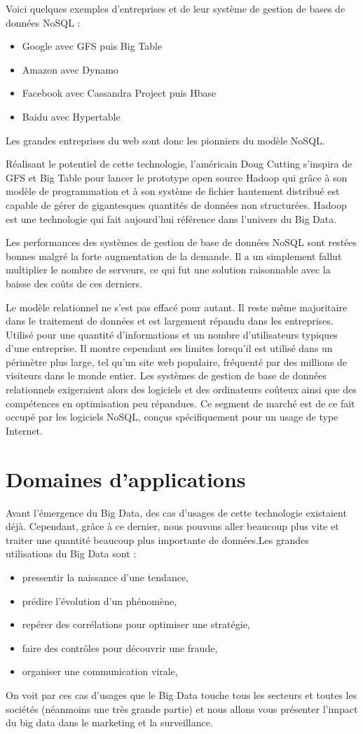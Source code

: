 \documentclass[12pt]{article}
\begin{document}
Voici quelques exemples d’entreprises et de leur système de gestion de bases de données NoSQL :
\begin{itemize}
\item Google avec GFS puis Big Table 
\item Amazon avec Dynamo
\item Facebook avec Cassandra Project puis Hbase
\item Baidu avec Hypertable
\end{itemize}
\par
Les grandes entreprises du web sont donc les pionniers du modèle NoSQL.
\par
Réalisant le potentiel de cette technologie, l’américain Doug Cutting s’inspira de GFS et Big Table pour lancer le prototype open source Hadoop qui grâce à son modèle de programmation et à son système de fichier hautement distribué est capable de gérer de gigantesques quantités de données non structurées. Hadoop est une technologie qui fait aujourd’hui référence dans l’univers du Big Data.
\par
Les performances des systèmes de gestion de base de données NoSQL sont restées bonnes malgré la forte augmentation de la demande. Il a un simplement fallut multiplier le nombre de serveurs, ce qui fut une solution raisonnable  avec la baisse des coûts de ces derniers.
\par
Le modèle relationnel ne s’est pas effacé pour autant. Il reste même majoritaire dans le traitement de données et est largement répandu dans les entreprises. Utilisé pour une quantité d'informations et un nombre d'utilisateurs typiques d'une entreprise. Il montre cependant ses limites lorsqu'il est utilisé dans un périmètre plus large, tel qu'un site web populaire, fréquenté par des millions de visiteurs dans le monde entier. Les systèmes de gestion de base de données relationnels exigeraient alors des logiciels et des ordinateurs coûteux ainsi que des compétences en optimisation peu répandues. Ce segment de marché est de ce fait occupé par les logiciels NoSQL, conçus spécifiquement pour un usage de type Internet.
\pagebreak
\section{Domaines d'applications}
Avant l'émergence du Big Data, des cas d'usages de cette technologie existaient déjà.
Cependant, grâce à ce dernier, nous pouvons aller beaucoup plus vite et traiter une quantité beaucoup plus importante de données.Les grandes utilisations du Big Data sont : 
\begin{itemize}
\item pressentir la naissance d’une tendance,
\item prédire l’évolution d’un phénomène,
\item repérer des corrélations pour optimiser une stratégie,
\item faire des contrôles pour découvrir une fraude,
\item organiser une communication virale,
\end{itemize}
On voit par ces cas d'usages que le Big Data touche tous les secteurs et toutes les sociétés (néanmoins une très grande partie) et nous allons vous présenter  l'impact du big data dans le marketing et la surveillance.
\end{document}
